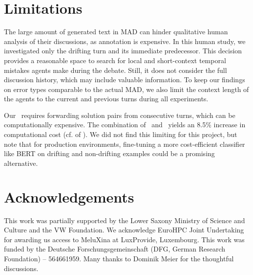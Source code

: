 \section*{Limitations}

The large amount of generated text in MAD can hinder qualitative human analysis of their discussions, as annotation is expensive.
In this human study, we investigated only the drifting turn and its immediate predecessor.
This decision provides a reasonable space to search for local and short-context temporal mistakes agents make during the debate. 
Still, it does not consider the full discussion history, which may include valuable information.
To keep our findings on error types comparable to the actual MAD, we also limit the context length of the agents to the current and previous turns during all experiments.

Our \judge\ requires forwarding solution pairs from consecutive turns, which can be computationally expensive. 
The combination of \judge\ and \policy\ yields an 8.5\% increase in computational cost (cf.  of ).
We did not find this limiting for this project, but note that for production environments, fine-tuning a more cost-efficient classifier like BERT \citep{sun2020finetuneberttextclassification} on drifting and non-drifting examples could be a promising alternative.


\section*{Acknowledgements}
This work was partially supported by the Lower Saxony Ministry of Science and Culture and the VW Foundation. 
We acknowledge EuroHPC Joint Undertaking for awarding us access to MeluXina at LuxProvide, Luxembourg.
This work was funded by the Deutsche Forschungsgemeinschaft (DFG, German Research Foundation) – 564661959.
Many thanks to Dominik Meier for the thoughtful discussions.
